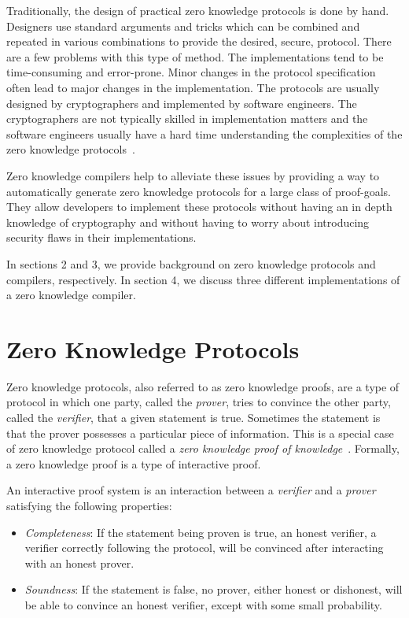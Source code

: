 \documentclass{sig-alternate}
\begin{document}
	Traditionally, the design of practical zero knowledge protocols
	is done by hand. Designers use standard arguments and tricks which
	can be combined and repeated in various combinations to provide the 
	desired, secure, protocol. There are a few problems with this type
	of method. The implementations tend to be time-consuming
	and error-prone. Minor changes in the protocol specification often
	lead to major changes in the implementation. The protocols are usually
	designed by cryptographers and implemented by software engineers. The
	cryptographers are not typically skilled in implementation matters and
	the software engineers usually have a hard time understanding the
	complexities of the zero knowledge protocols~\cite{Sigma:2009}. 

	Zero knowledge compilers help to alleviate these issues by providing
	a way to automatically generate zero knowledge protocols for a large
	class of proof-goals. They allow developers to implement these protocols
	without having an in depth knowledge of cryptography and without having to
	worry about introducing security flaws in their implementations.

	In sections 2 and 3, we provide background on zero knowledge protocols and
	compilers, respectively. In section 4, we discuss three different 
	implementations of a zero knowledge compiler.

\section{Zero Knowledge Protocols}
	Zero knowledge protocols, also referred to as zero knowledge proofs, are a type
	of protocol in which one party, called the \textit{prover}, tries to convince the 
	other party, called the \textit{verifier}, that a given statement is true. Sometimes
	the statement is that the prover possesses a particular piece of information. This
	is a special case of zero knowledge protocol called a \textit{zero knowledge proof
	of knowledge}~\cite{Wiki}. Formally, a zero knowledge proof is a type of interactive
	proof.
	
	An interactive proof system is an interaction between a
	\textit{verifier} and
	a \textit{prover} satisfying the following properties:
			
	\begin{itemize}
		\item \textit{Completeness}: If the statement being proven is true, an
		honest verifier, a verifier correctly following the protocol, will be
		convinced after interacting with an honest prover.
			
		\item \textit{Soundness}: If the statement is false, no prover, either
		honest or dishonest, will be able to convince an honest verifier, except
		with some small probability.
	\end{itemize}
	
\end{document}
